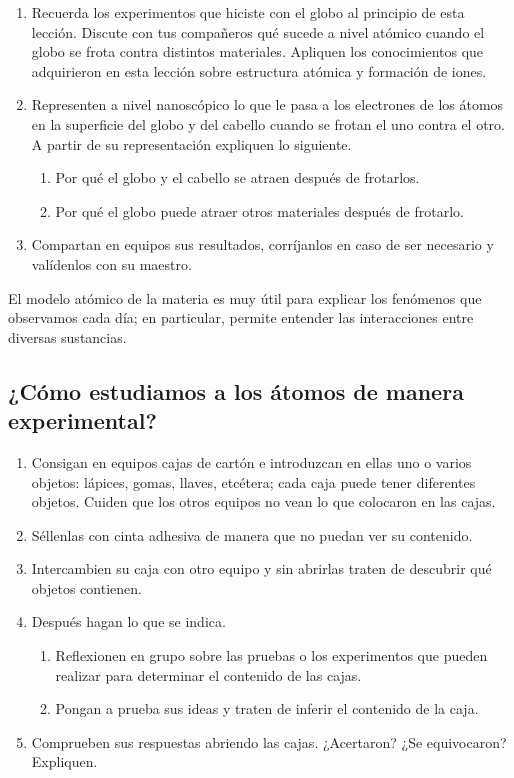 \documentclass[11pt]{book}
\begin{document}
\begin{boxK}
  \begin{enumerate}
    \item Recuerda los experimentos que hiciste con el globo al principio de esta lección. Discute con tus compañeros qué sucede a nivel atómico cuando el globo se frota contra distintos materiales. Apliquen los conocimientos que adquirieron en esta lección sobre estructura atómica y formación de iones.
    \item Representen a nivel nanoscópico lo que le pasa a los electrones de los átomos en la superficie del globo y del cabello cuando se frotan el uno contra el otro. A partir de su representación expliquen lo siguiente.
          \begin{enumerate}
            \item Por qué el globo y el cabello se atraen después de frotarlos.
            \item Por qué el globo puede atraer otros materiales después de frotarlo.
          \end{enumerate}
    \item Compartan en equipos sus resultados, corríjanlos en caso de ser necesario y valídenlos con su maestro.
  \end{enumerate}
\end{boxK}

El modelo atómico de la materia es muy útil para explicar los fenómenos que observamos cada día;
en particular, permite entender las interacciones entre diversas sustancias.

\newpage
\subsection{¿Cómo estudiamos a los átomos de manera experimental?}
\begin{boxK}
  \begin{enumerate}
    \item Consigan en equipos cajas de cartón e introduzcan en ellas uno o varios objetos: lápices, gomas,
          llaves, etcétera; cada caja puede tener diferentes objetos. Cuiden que los otros equipos no vean
          lo que colocaron en las cajas.
    \item Séllenlas con cinta adhesiva de manera que no puedan ver su contenido.
    \item Intercambien su caja con otro equipo y sin abrirlas traten de descubrir qué objetos contienen.
    \item Después hagan lo que se indica.
          \begin{enumerate}
            \item Reflexionen en grupo sobre las pruebas o los experimentos que pueden realizar para determinar
                  el contenido de las cajas.
            \item Pongan a prueba sus ideas y traten de inferir el contenido de la caja.
          \end{enumerate}
    \item Comprueben sus respuestas abriendo las cajas. ¿Acertaron? ¿Se equivocaron? Expliquen.
  \end{enumerate}
\end{boxK}
\end{document}
